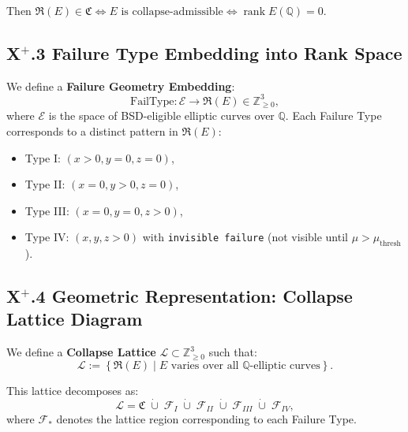 \documentclass[11pt]{article}
\DeclareMathOperator{\rank}{rank}
\begin{document}
Then $\mathfrak{R}(E) \in \mathfrak{C} \iff E \text{ is collapse-admissible} \iff \rank E(\mathbb{Q}) = 0$.

\subsection*{X$^+$.3 Failure Type Embedding into Rank Space}

We define a \textbf{Failure Geometry Embedding}:
\[
\mathrm{FailType} : \mathcal{E} \to \mathfrak{R}(E) \in \mathbb{Z}_{\geq 0}^3,
\]
where $\mathcal{E}$ is the space of BSD-eligible elliptic curves over $\mathbb{Q}$. Each Failure Type corresponds to a distinct pattern in $\mathfrak{R}(E)$:

\begin{itemize}
  \item Type I: $(x > 0, y = 0, z = 0)$,
  \item Type II: $(x = 0, y > 0, z = 0)$,
  \item Type III: $(x = 0, y = 0, z > 0)$,
  \item Type IV: $(x, y, z > 0)$ with \texttt{invisible failure} (not visible until $\mu > \mu_{\mathrm{thresh}}$).
\end{itemize}

\subsection*{X$^+$.4 Geometric Representation: Collapse Lattice Diagram}

We define a \textbf{Collapse Lattice} $\mathcal{L} \subset \mathbb{Z}_{\geq 0}^3$ such that:
\[
\mathcal{L} := \left\{ \mathfrak{R}(E) \mid E \text{ varies over all } \mathbb{Q}\text{-elliptic curves} \right\}.
\]

This lattice decomposes as:
\[
\mathcal{L} = \mathfrak{C} \;\dot{\cup}\; \mathcal{F}_I \;\dot{\cup}\; \mathcal{F}_{II} \;\dot{\cup}\; \mathcal{F}_{III} \;\dot{\cup}\; \mathcal{F}_{IV},
\]
where $\mathcal{F}_*$ denotes the lattice region corresponding to each Failure Type.
\end{document}
